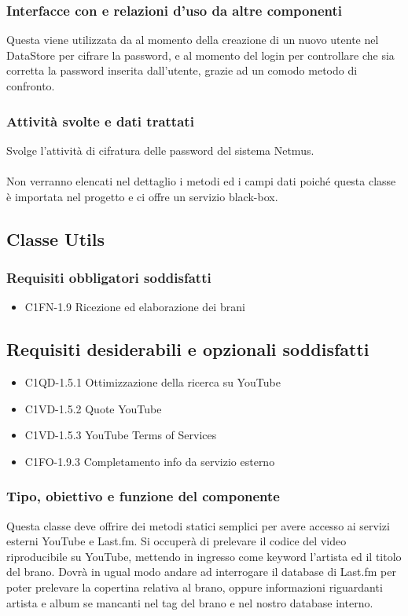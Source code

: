 \subsubsection*{Interfacce con e relazioni d'uso da altre componenti}
Questa viene utilizzata da  al momento della creazione di
un nuovo utente nel DataStore per cifrare la password, e al momento del login
per controllare che sia corretta la password inserita dall'utente, grazie ad un
comodo metodo di confronto.
 \subsubsection*{Attivit\`a svolte e dati trattati}
Svolge l'attivit\`a di cifratura delle password del sistema Netmus.
\\\\
Non verranno elencati nel dettaglio i metodi ed i campi dati poich\'e questa
classe \`e importata nel progetto e ci offre un servizio black-box.

\subsection{Classe Utils}
\subsubsection*{Requisiti obbligatori soddisfatti}
\begin{itemize}
    \item C1FN-1.9 Ricezione ed elaborazione dei brani
\end{itemize}
\subsection*{Requisiti desiderabili e opzionali soddisfatti}
\begin{itemize}
    \item C1QD-1.5.1 Ottimizzazione della ricerca su YouTube
    \item C1VD-1.5.2 Quote YouTube
    \item C1VD-1.5.3 YouTube Terms of Services
    \item C1FO-1.9.3 Completamento info da servizio esterno
\end{itemize}
\subsubsection*{Tipo, obiettivo e funzione del componente}
Questa classe deve offrire dei metodi statici semplici per avere accesso ai
servizi esterni YouTube e Last.fm. Si occuper\`a di prelevare il codice
del video riproducibile su YouTube, mettendo in ingresso come keyword l'artista
ed il titolo del brano. Dovr\`a in ugual modo andare ad interrogare il database
di Last.fm per poter prelevare la copertina relativa al brano, oppure
informazioni riguardanti artista e album se mancanti nel tag del brano e nel
nostro database interno.
